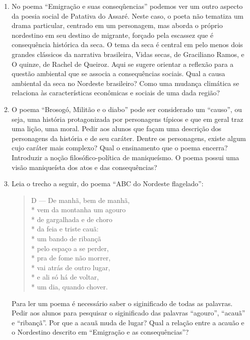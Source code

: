 \begin{enumerate}
\item No poema “Emigração e suas conseqûencias” podemos ver um outro aspecto da
  poesia social de Patativa do Assaré. Neste caso, o poeta não tematiza um
  drama particular, centrado em um personagem, mas aborda o próprio nordestino
  em seu destino de migrante, forçado pela escassez que é consequência
  histórica da seca. O tema da seca é central em pelo menos dois grandes
  clássicos da narrativa brasileira, Vidas secas, de Graciliano Ramos, e O
  quinze, de Rachel de Queiroz. Aqui se sugere orientar a reflexão para a
  questão ambiental que se associa a consequências sociais. Qual a causa
  ambiental da seca no Nordeste brasileiro? Como uma mudança climática se
  relaciona às características econômicas e sociais de uma dada região? 

\item O poema “Brosogó, Militão e o diabo” pode ser considerado um “causo”, ou
  seja, uma história protagonizada por personagens típicos e que em geral traz
  uma lição, uma moral. Pedir aos alunos que façam uma descrição dos
  personagens da história e de seu caráter. Dentre os personagens, existe algum
  cujo caráter mais complexo? Qual o ensinamento que o poema encerra?
  Introduzir a noção filosófico-política de maniqueísmo. O poema possui uma
  visão maniqueísta dos atos e das consequências?

\item Leia o trecho a seguir, do poema “ABC do Nordeste flagelado”:
\begin{verse}

D — De manhã, bem de manhã,\\*
vem da montanha um agouro\\* 
de gargalhada e de choro\\*  
da feia e triste cauã:\\* 
um bando de ribançã\\*  
pelo espaço a se perder,\\*
pra de fome não morrer,\\*
vai atrás de outro lugar,\\*
e ali só há de voltar,\\*
um dia, quando chover.

\end{verse}

Para ler um poema é necessário saber o siginificado de todas as palavras. Pedir
aos alunos para pesquisar o siginificado das palavras “agouro”, “acauã” e
“ribançã”. Por que a acauã muda de lugar? Qual a relação entre a acauão e o
Nordestino descrito em “Emigração e as consequências”? 

\end{enumerate}

